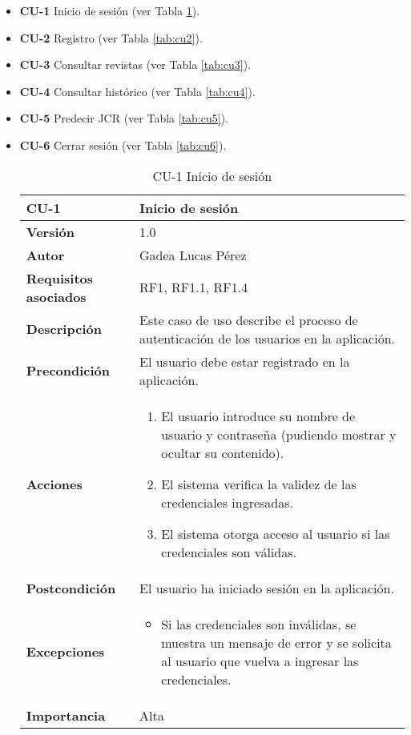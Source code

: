 \begin{itemize}
\item \textbf{CU-1} Inicio de sesión (ver Tabla \ref{tab:cu1}).
\item \textbf{CU-2} Registro (ver Tabla \ref{tab:cu2}).
\item \textbf{CU-3} Consultar revistas (ver Tabla \ref{tab:cu3}).
\item \textbf{CU-4} Consultar histórico (ver Tabla \ref{tab:cu4}).
\item \textbf{CU-5} Predecir JCR (ver Tabla \ref{tab:cu5}).
\item \textbf{CU-6} Cerrar sesión (ver Tabla \ref{tab:cu6}).

\begin{table}[p]
\centering
\begin{tabularx}{\linewidth}{ p{} p{} }
\toprule
\textbf{CU-1} & \textbf{Inicio de sesión}\\
\toprule
\textbf{Versión} & 1.0 \\
\textbf{Autor} & Gadea Lucas Pérez \\
\textbf{Requisitos asociados} & RF1, RF1.1, RF1.4  \\
\textbf{Descripción} & Este caso de uso describe el proceso de autenticación de los usuarios en la aplicación.\\
\textbf{Precondición} & El usuario debe estar registrado en la aplicación.\\
\textbf{Acciones} &
\begin{enumerate}
\def\labelenumi{\arabic{enumi}.}
\tightlist
\item El usuario introduce su nombre de usuario y contraseña (pudiendo mostrar y ocultar su contenido).
\item El sistema verifica la validez de las credenciales ingresadas.
\item El sistema otorga acceso al usuario si las credenciales son válidas.
\end{enumerate}\\
\textbf{Postcondición} & El usuario ha iniciado sesión en la aplicación.\\
\textbf{Excepciones} &
\begin{itemize}
\item Si las credenciales son inválidas, se muestra un mensaje de error y se solicita al usuario que vuelva a ingresar las credenciales.
\end{itemize}\\
\textbf{Importancia} & Alta\\
\bottomrule
\end{tabularx}
\caption{CU-1 Inicio de sesión}
\label{tab:cu1}
\end{table}



\end{itemize}
